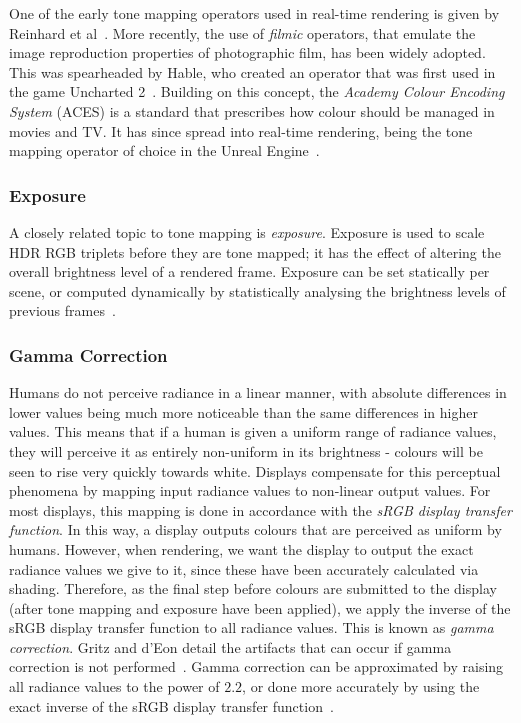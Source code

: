 One of the early tone mapping operators used in real-time rendering is given by Reinhard et al~\cite{Reinhard}. More recently, the use of \textit{filmic} operators, that emulate the image reproduction properties of photographic film, has been widely adopted. This was spearheaded by Hable, who created an operator that was first used in the game Uncharted 2~\cite{Hable}. Building on this concept, the \textit{Academy Colour Encoding System} (ACES) is a standard that prescribes how colour should be managed in movies and TV. It has since spread into real-time rendering, being the tone mapping operator of choice in the Unreal Engine~\cite{ACESUnreal}.

\subsubsection{Exposure}

A closely related topic to tone mapping is \textit{exposure}. Exposure is used to scale HDR RGB triplets before they are tone mapped; it has the effect of altering the overall brightness level of a rendered frame. Exposure can be set statically per scene, or computed dynamically by statistically analysing the brightness levels of previous frames~\cite{RTR4}.

\subsubsection{Gamma Correction}

Humans do not perceive radiance in a linear manner, with absolute differences in lower values being much more noticeable than the same differences in higher values. This means that if a human is given a uniform range of radiance values, they will perceive it as entirely non-uniform in its brightness - colours will be seen to rise very quickly towards white. Displays compensate for this perceptual phenomena by mapping input radiance values to non-linear output values. For most displays, this mapping is done in accordance with the \textit{sRGB display transfer function}. In this way, a display outputs colours that are perceived as uniform by humans. However, when rendering, we want the display to output the exact radiance values we give to it, since these have been accurately calculated via shading. Therefore, as the final step before colours are submitted to the display (after tone mapping and exposure have been applied), we apply the inverse of the sRGB display transfer function to all radiance values. This is known as \textit{gamma correction}. Gritz and d'Eon detail the artifacts that can occur if gamma correction is not performed~\cite{GPUGemsChapter24}. Gamma correction can be approximated by raising all radiance values to the power of \begin{math}2.2\end{math}, or done more accurately by using the exact inverse of the sRGB display transfer function~\cite{MovingFrostbitetoPBR}.